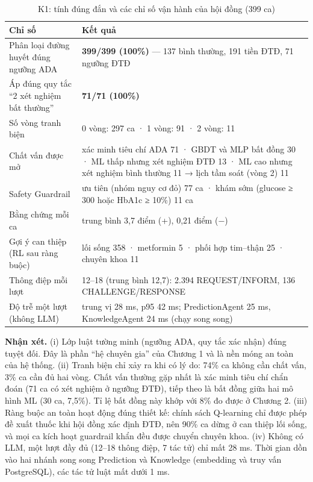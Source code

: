 \begin{table}[H]
\centering
\caption{K1: tính đúng đắn và các chỉ số vận hành của hội đồng (399 ca)}
\label{tab:k1}
\small
\begin{tabularx}{\linewidth}{@{}L{6.2cm}Y@{}}
\toprule
\textbf{Chỉ số} & \textbf{Kết quả} \\
\midrule
Phân loại đường huyết đúng ngưỡng ADA & \textbf{399/399 (100\%)} — 137 bình thường, 191 tiền ĐTĐ, 71 ngưỡng ĐTĐ \\
Áp đúng quy tắc ``2 xét nghiệm bất thường'' & \textbf{71/71 (100\%)} \\
Số vòng tranh biện & 0 vòng: 297 ca · 1 vòng: 91 · 2 vòng: 11 \\
Chất vấn được mở & xác minh tiêu chí ADA 71 · GBDT và MLP bất đồng 30 · ML thấp nhưng xét nghiệm ĐTĐ 13 · ML cao nhưng xét nghiệm bình thường 11 → lịch tầm soát (vòng 2) 11 \\
Safety Guardrail & ưu tiên (nhóm nguy cơ đỏ) 77 ca · khám sớm (glucose ≥ 300 hoặc HbA1c ≥ 10\%) 11 ca \\
Bằng chứng mỗi ca & trung bình 3,7 điểm (+), 0,21 điểm (−) \\
Gợi ý can thiệp (RL sau ràng buộc) & lối sống 358 · metformin 5 · phối hợp tim–thận 25 · chuyên khoa 11 \\
Thông điệp mỗi lượt & 12–18 (trung bình 12,7): 2.394 REQUEST/INFORM, 136 CHALLENGE/RESPONSE \\
Độ trễ một lượt (không LLM) & trung vị 28 ms, p95 42 ms; PredictionAgent 25 ms, KnowledgeAgent 24 ms (chạy song song) \\
\bottomrule
\end{tabularx}
\end{table}


\textbf{Nhận xét.} (i) Lớp luật tường minh (ngưỡng ADA, quy tắc xác nhận) đúng tuyệt đối. Đây là phần ``hệ chuyên gia'' của Chương 1 và là nền móng an toàn của hệ thống. (ii) Tranh biện chỉ xảy ra khi có lý do: 74\% ca không cần chất vấn, 3\% ca cần đủ hai vòng. Chất vấn thường gặp nhất là xác minh tiêu chí chẩn đoán (71 ca có xét nghiệm ở ngưỡng ĐTĐ), tiếp theo là bất đồng giữa hai mô hình ML (30 ca, 7,5\%). Tỉ lệ bất đồng này khớp với 8\% đo được ở Chương 2. (iii) Ràng buộc an toàn hoạt động đúng thiết kế: chính sách Q-learning chỉ được phép đề xuất thuốc khi hội đồng xác định ĐTĐ, nên 90\% ca dừng ở can thiệp lối sống, và mọi ca kích hoạt guardrail khẩn đều được chuyển chuyên khoa. (iv) Không có LLM, một lượt đầy đủ (12–18 thông điệp, 7 tác tử) chỉ mất 28 ms. Thời gian dồn vào hai nhánh song song Prediction và Knowledge (embedding và truy vấn PostgreSQL), các tác tử luật mất dưới 1 ms.

